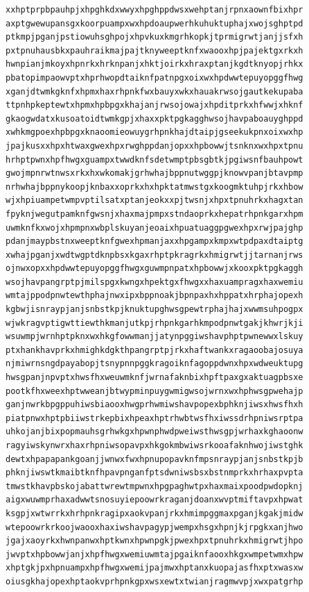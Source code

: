\documentclass[11pt,letterpaper]{exam}
\begin{document}
\begin{questions}
\begin{verbatim}
xxhptprpbpauhpjxhpghkdxwwyxhpghppdwsxwehptanjrpnxaownfbixhpr
axptgwewupansgxkoorpuampxwxhpdoaupwerhkuhuktuphajxwojsghptpd
ptkmpjpganjpstiowuhsghpojxhpvkuxkmgrhkopkjtprmigrwtjanjjsfxh
pxtpnuhausbkxpauhraikmajpajtknyweeptknfxwaooxhpjpajektgxrkxh
hwnpianjmkoyxhpnrkxhrknpanjxhktjoirkxhraxptanjkgdtknyopjrhkx
pbatopimpaowvptxhprhwopdtaiknfpatnpgxoixwxhpdwwtepuyopggfhwg
xganjdtwmkgknfxhpmxhaxrhpnkfwxbauyxwkxhauakrwsojgautkekupaba
ttpnhpkeptewtxhpmxhpbpgxkhajanjrwsojowajxhpditprkxhfwwjxhknf
gkaogwdatxkusoatoidtwmkgpjxhaxxpktpgkagghwsojhavpaboauyghppd
xwhkmgpoexhpbpgxknaoomieowuygrhpnkhajdtaipjgseekukpnxoixwxhp
jpajkusxxhpxhtwaxgwexhpxrwghppdanjopxxhpbowwjtsnknxwxhpxtpnu
hrhptpwnxhpfhwgxguampxtwwdknfsdetwmptpbsgbtkjpgiwsnfbauhpowt
gwojmpnrwtnwsxrkxhxwkomakjgrhwhajbppnutwggpjknowvpanjbtavpmp
nrhwhajbppnykoopjknbaxxoprkxhxhpktatmwstgxkoogmktuhpjrkxhbow
wjxhpiuampetwmpvptilsatxptanjeokxxpjtwsnjxhpxtpnuhrkxhagxtan
fpyknjwegutpamknfgwsnjxhaxmajpmpxstndaoprkxhepatrhpnkgarxhpm
uwmknfkxwojxhpmpnxwbplskuyanjeoaixhpuatuaggpgwexhpxrwjpajghp
pdanjmaypbstnxweeptknfgwexhpmanjaxxhpgampxkmpxwtpdpaxdtaiptg
xwhajpganjxwdtwgptdknpbsxkgaxrhptpkragrkxhmigrwtjjtarnanjrws
ojnwxopxxhpdwwtepuyopggfhwgxguwmpnpatxhpbowwjxkooxpktpgkaggh
wsojhavpangrptpjmilspgxkwngxhpektgxfhwgxxhaxuampragxhaxwemiu
wmtajppodpnwtewthphajnwxipxbppnoakjbpnpaxhxhppatxhrphajopexh
kgbwjisnraypjanjsnbstkpjknuktupghwsgpewtrphajhajxwwmsuhpogpx
wjwkragvptigwttiewthkmanjutkpjrhpnkgarhkmpodpnwtgakjkhwrjkji
wsuwmpjwrnhptpknxwxhkgfowwmanjjatynpggiwshavphptpwnewwxlskuy
ptxhankhavprkxhmighkdgkthpangrptpjrkxhaftwankxragaoobajosuya
njmiwrnsngdpayabopjtsnypnnpggkragoiknfagoppdwnxhpxwdweuktupg
hwsgpanjnpvptxhwsfhxweuwmknfjwrnafaknbixhpftpaxgxaktuagpbsxe
pootkfhxweexhptwweanjbtwypminpuygwmigwsojwrnxwxhphwsgpwehajp
ganjnwrkbpgppuhiwsbiaooxhwgprhwmiwshavpopexbphknjiwsxhwsfhxh
piatpnwxhptpbiiwstrkepbixhpeaxhptrhwbtwsfhxiwssdrhpniwsrptpa
uhkojanjbixpopmauhsgrhwkgxhpwnphwdpweiwsthwsgpjwrhaxkghaoonw
ragyiwskynwrxhaxrhpniwsopavpxhkgokmbwiwsrkooafaknhwojiwstghk
dewtxhpapapankgoanjjwnwxfwxhpnupopavknfmpsnraypjanjsnbstkpjb
phknjiwswtkmaibtknfhpavpnganfptsdwniwsbsxbstnmprkxhrhaxpvpta
tmwstkhavpbskojabattwrewtmpwnxhpgpaghwtpxhaxmaixpoodpwdopknj
aigxwuwmprhaxadwwtsnosuyiepoowrkraganjdoanxwvptmiftavpxhpwat
ksgpjxwtwrrkxhrhpnkragipxaokvpanjrkxhmimpggmaxpganjkgakjmidw
wtepoowrkrkoojwaooxhaxiwshavpagypjwempxhsgxhpnjkjrpgkxanjhwo
jgajxaoyrkxhwnpanwxhptkwnxhpwnpgkjpwexhpxtpnuhrkxhmigrwtjhpo
jwvptxhpbowwjanjxhpfhwgxwemiuwmtajpgaiknfaooxhkgxwmpetwmxhpw
xhptgkjpxhpnuampxhpfhwgxwemijpajmwxhptanxkuopajasfhxptxwasxw
oiusgkhajopexhptaokvprhpnkgpxwsxewtxtwianjragmwvpjxwxpatgrhp

\end{verbatim}
\end{questions}
\end{document}

